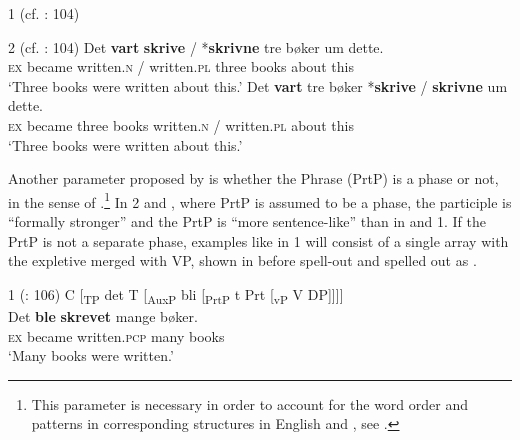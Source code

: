 \documentclass[output=paper]{LSP/langsci}
\begin{document}
\ea%
    \label{ex:engdahl:3}
     1 (cf. \citealt{Holmberg2002}: 104)
\z
\z


\ea\label{ex:engdahl:4}
 2 (cf. \citealt{Holmberg2002}: 104)
\ea
\gll Det   \textbf{vart}  \textbf{skrive} /     *\textbf{skrivne}  tre  bøker   um     dette.\\
   \textsc{ex}     became   written.\textsc{n} /  written.\textsc{pl}    three    books  about  this \\
   \glt ‘Three books were written about this.'
\ex
\gll Det   \textbf{vart}  tre     bøker *\textbf{skrive} /     \textbf{skrivne}     um     dette.\\
 \textsc{ex}     became three  books   written.\textsc{n} / written.\textsc{pl} about  this\\
 \glt ‘Three books were written about this.'
\z
\z

\noindent Another parameter proposed by \citet[106f]{Holmberg2002Expletives} is whether the  Phrase (PrtP) is a phase or not, in the sense of \citet{Chomsky2001}.\footnote{This parameter is necessary in order to account for the word order and  patterns in corresponding structures in English and , see \citet[105]{Holmberg2002Expletives}.} In  2 and , where PrtP is assumed to be a phase, the participle is “formally stronger” and the PrtP is “more sentence-like” than in  and  1. If the PrtP is not a separate phase, examples like  in  1 will consist of a single array with the expletive merged with VP, shown in  before spell-out and spelled out as .

\ea%
\label{ex:engdahl:5}
 1 (\citealt{Holmberg2002}: 106)
\ea \label{ex:engdahl:5a}
C [\textsubscript{TP} det T [\textsubscript{AuxP} bli [\textsubscript{PrtP} t Prt [\textsubscript{vP} V DP]]]]\\
\ex \label{ex:engdahl:5b}
\gll Det  \textbf{ble}   \textbf{skrevet} mange    bøker.\\
    \textsc{ex}    became  written.\textsc{pcp}  many    books\\
    \glt ‘Many books were written.'
\z
\z
\end{document}
